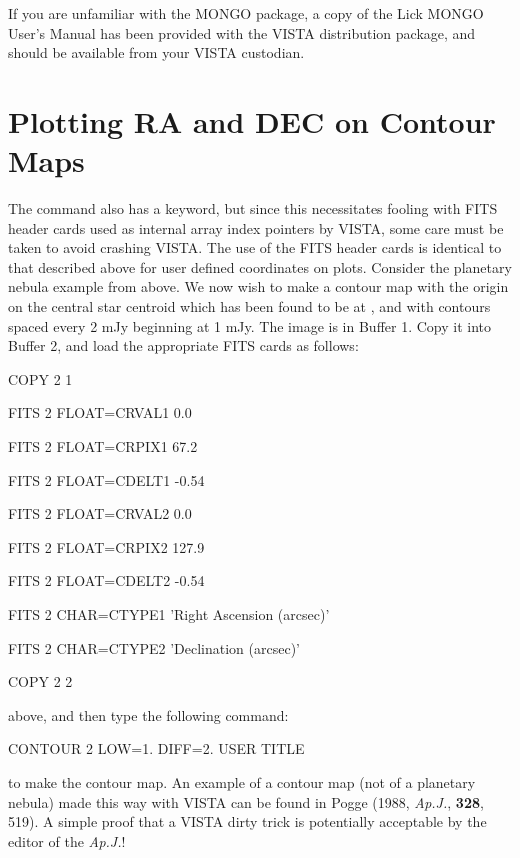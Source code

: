 If you are unfamiliar with the MONGO package, a copy of the Lick MONGO User's
Manual has been provided with the VISTA distribution package, and should be
available from your VISTA custodian.


\section{Plotting RA and DEC on Contour Maps}

The  command also has a  keyword, but since this
necessitates fooling with FITS header cards used as internal array index
pointers by VISTA, some care must be taken to avoid crashing VISTA.  The use
of the FITS header cards is identical to that described above for user defined
coordinates on plots.  Consider the planetary nebula example from above.  We
now wish to make a contour map with the origin on the central star centroid
which has been found to be at , and with contours
spaced every 2 mJy beginning at 1 mJy.  The image is in Buffer 1.  Copy it
into Buffer 2, and load the appropriate FITS cards as follows:
\begin{command}
      \item COPY 2 1
      \item FITS 2 FLOAT=CRVAL1 0.0
      \item FITS 2 FLOAT=CRPIX1 67.2
      \item FITS 2 FLOAT=CDELT1 -0.54
      \item FITS 2 FLOAT=CRVAL2 0.0
      \item FITS 2 FLOAT=CRPIX2 127.9
      \item FITS 2 FLOAT=CDELT2 -0.54
      \item FITS 2 CHAR=CTYPE1 'Right Ascension (arcsec)'
      \item FITS 2 CHAR=CTYPE2 'Declination (arcsec)'
      \item COPY 2 2
\end{command}
above, and then type the following command:
\begin{command}
      \item CONTOUR 2 LOW=1. DIFF=2. USER TITLE
\end{command}
to make the contour map.  An example of a contour map (not of a planetary
nebula) made this way with VISTA can be found in Pogge (1988, {\it Ap.J.},
{\bf 328}, 519).  A simple proof that a VISTA dirty trick is potentially
acceptable by the editor of the {\it Ap.J.}!

